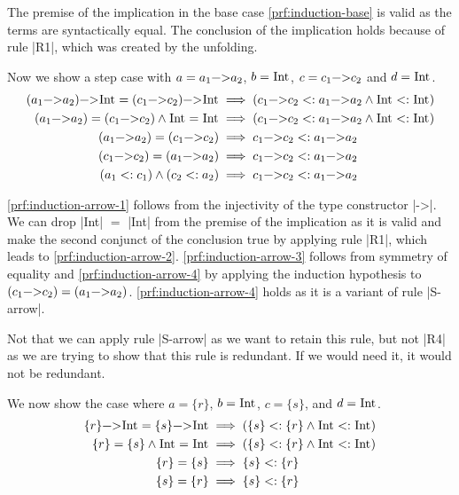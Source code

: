The premise of the implication in the base case
\ref{prf:induction-base} is valid as the terms are syntactically
equal. The conclusion of the implication holds because of rule
\code|R1|, which was created by the unfolding.

Now we show a step case with $a = a_1 \text{\code|->|} a_2$, $b =
\text{\code|Int|}$, $c = c_1 \text{\code|->|} c_2$ and $d =
\text{\code|Int|}$.
\begin{align}
  (a_1 \text{\code|->|} a_2) \text{\code|->|} \text{\code|Int|} = (c_1
  \text{\code|->|} c_2) \text{\code|->|} \text{\code|Int|} &\implies (
  c_1 \text{\code|->|} c_2 <: a_1 \text{\code|->|} a_2\land
  \text{\code|Int|} <: \text{\code|Int|}) \\
  (a_1 \text{\code|->|} a_2) = (c_1 \text{\code|->|} c_2) \land
  \text{\code|Int|} = \text{\code|Int|} &\implies (c_1
  \text{\code|->|} c_2 <: a_1 \text{\code|->|} a_2 \land
  \text{\code|Int|} <:
  \text{\code|Int|}) \label{prf:induction-arrow-1} \\
  (a_1 \text{\code|->|} a_2) = (c_1 \text{\code|->|} c_2) &\implies
  c_1 \text{\code|->|} c_2 <: a_1 \text{\code|->|}
  a_2 \label{prf:induction-arrow-2} \\
  (c_1 \text{\code|->|} c_2) = (a_1 \text{\code|->|} a_2) &\implies
  c_1 \text{\code|->|} c_2 <: a_1 \text{\code|->|}
  a_2 \label{prf:induction-arrow-3} \\
  (a_1 <: c_1) \land (c_2 <: a_2) &\implies c_1 \text{\code|->|} c_2
  <: a_1 \text{\code|->|} a_2 \label{prf:induction-arrow-4}
\end{align}

\ref{prf:induction-arrow-1} follows from the injectivity of the type
constructor \code|->|. We can drop \code|Int| $=$ \code|Int| from the
premise of the implication as it is valid and make the second conjunct
of the conclusion true by applying rule \code|R1|, which leads to
\ref{prf:induction-arrow-2}. \ref{prf:induction-arrow-3} follows from
symmetry of equality and \ref{prf:induction-arrow-4} by applying
the induction hypothesis to $(c_1 \text{\code|->|} c_2) = (a_1
\text{\code|->|} a_2)$. \ref{prf:induction-arrow-4} holds as it is a
variant of rule \code|S-arrow|.

Not that we can apply rule \code|S-arrow| as we want to retain this
rule, but not \code|R4| as we are trying to show that this rule is
redundant. If we would need it, it would not be redundant.

We now show the case where $a = \{ r \}$, $b = \text{\code|Int|}$, $c
= \{s\}$, and $d = \text{\code|Int|}$.
\begin{align}
  \{ r \} \text{\code|->|} \text{\code|Int|} = \{ s \}
  \text{\code|->|} \text{\code|Int|} &\implies (\{s\} <: \{r\} \land
  \text{\code|Int|} <: \text{\code|Int|}) \\
  \{ r \} = \{ s \} \land \text{\code|Int|} = \text{\code|Int|}
  &\implies (\{s\} <: \{r\} \land \text{\code|Int|} <:
  \text{\code|Int|}) \label{prf:induction-record-1}\\
  \{ r \} = \{ s \} &\implies \{s\} <:
  \{r\} \label{prf:induction-record-2} \\
  \{ s \} = \{ r \} &\implies \{s\} <:
  \{r\} \label{prf:induction-record-3}
\end{align}

